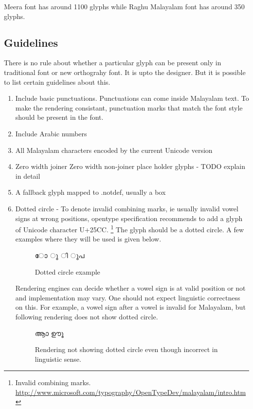 Meera font has around 1100 glyphs while Raghu Malayalam font has around 350 
glyphs.

\subsection{Guidelines}

There is no rule about whether a particular glyph can be present only in
traditional font or new orthograhy font. It is upto the designer. But it is 
possible to list certain guidelines about this.

\begin{enumerate}
\item Include basic punctuations. Punctuations can come inside Malayalam text.
To make the rendering consistant, punctuation marks that match the font style 
should be present in the font.
\item Include Arabic numbers
\item All Malayalam characters encoded by the current Unicode version
\item Zero width joiner Zero width non-joiner place holder glyphs - TODO 
explain in detail
\item A fallback glyph mapped to .notdef, usually a box
\item Dotted circle - To denote invalid combining marks, ie usually invalid 
vowel signs at wrong positions, opentype specification 
recommends to add a glyph of Unicode character U+25CC.
\footnote{Invalid combining marks. 
\url{http://www.microsoft.com/typography/OpenTypeDev/malayalam/intro.htm}}
The glyph should be a 
dotted circle. A few examples where they will be used is given below.
\begin{figure}[h]
  \centering
  {\meera\textexample ോ ു ി ുപ }\\
  \caption{Dotted circle example}
\end{figure}

Rendering engines can decide whether a vowel sign is at valid position or not 
and implementation may vary.
One should not expect linguistic correctness on this. For example, a vowel sign 
after a vowel is invalid for Malayalam, but following rendering does not show 
dotted circle.

\begin{figure}[h]
  \centering
  {\meera\textexample ആാ ഊൂ }\\
  \caption{Rendering not showing dotted circle even though incorrect in 
linguistic sense.}
\end{figure}


\end{enumerate}
